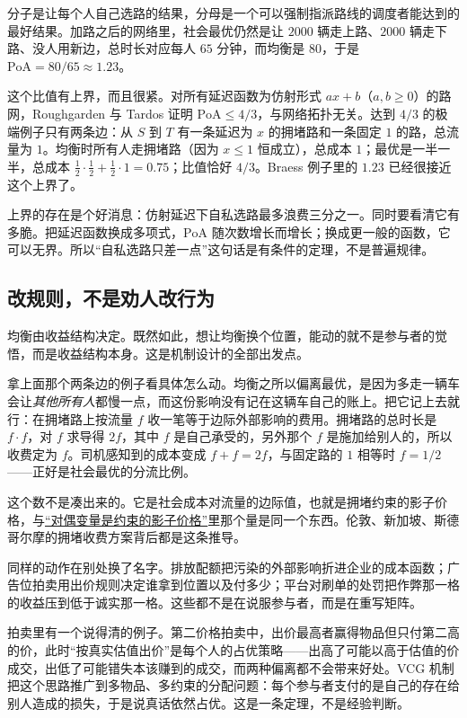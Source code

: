 分子是让每个人自己选路的结果，分母是一个可以强制指派路线的调度者能达到的最好结果。加路之后的网络里，社会最优仍然是让 \(2000\) 辆走上路、\(2000\) 辆走下路、没人用新边，总时长对应每人 \(65\) 分钟，而均衡是 \(80\)，于是 \(\mathrm{PoA}=80/65\approx1.23\)。

这个比值有上界，而且很紧。对所有延迟函数为仿射形式 \(a x+b\)（\(a,b\ge0\)）的路网，Roughgarden 与 Tardos 证明 \(\mathrm{PoA}\le4/3\)，与网络拓扑无关。达到 \(4/3\) 的极端例子只有两条边：从 \(S\) 到 \(T\) 有一条延迟为 \(x\) 的拥堵路和一条固定 \(1\) 的路，总流量为 \(1\)。均衡时所有人走拥堵路（因为 \(x\le1\) 恒成立），总成本 \(1\)；最优是一半一半，总成本 \(\tfrac12\cdot\tfrac12+\tfrac12\cdot1=0.75\)；比值恰好 \(4/3\)。Braess 例子里的 \(1.23\) 已经很接近这个上界了。

上界的存在是个好消息：仿射延迟下自私选路最多浪费三分之一。同时要看清它有多脆。把延迟函数换成多项式，\(\mathrm{PoA}\) 随次数增长而增长；换成更一般的函数，它可以无界。所以``自私选路只差一点''这句话是有条件的定理，不是普遍规律。

\subsection{改规则，不是劝人改行为}

均衡由收益结构决定。既然如此，想让均衡换个位置，能动的就不是参与者的觉悟，而是收益结构本身。这是机制设计的全部出发点。

拿上面那个两条边的例子看具体怎么动。均衡之所以偏离最优，是因为多走一辆车会让\emph{其他所有人}都慢一点，而这份影响没有记在这辆车自己的账上。把它记上去就行：在拥堵路上按流量 \(f\) 收一笔等于边际外部影响的费用。拥堵路的总时长是 \(f\cdot f\)，对 \(f\) 求导得 \(2f\)，其中 \(f\) 是自己承受的，另外那个 \(f\) 是施加给别人的，所以收费定为 \(f\)。司机感知到的成本变成 \(f+f=2f\)，与固定路的 \(1\) 相等时 \(f=1/2\)——正好是社会最优的分流比例。

这个数不是凑出来的。它是社会成本对流量的边际值，也就是拥堵约束的影子价格，与\hyperref[sec:09-Convex-Optimization/05-Duality/04]{``对偶变量是约束的影子价格''}里那个量是同一个东西。伦敦、新加坡、斯德哥尔摩的拥堵收费方案背后都是这条推导。

同样的动作在别处换了名字。排放配额把污染的外部影响折进企业的成本函数；广告位拍卖用出价规则决定谁拿到位置以及付多少；平台对刷单的处罚把作弊那一格的收益压到低于诚实那一格。这些都不是在说服参与者，而是在重写矩阵。

拍卖里有一个说得清的例子。第二价格拍卖中，出价最高者赢得物品但只付第二高的价，此时``按真实估值出价''是每个人的占优策略——出高了可能以高于估值的价成交，出低了可能错失本该赚到的成交，而两种偏离都不会带来好处。VCG 机制把这个思路推广到多物品、多约束的分配问题：每个参与者支付的是自己的存在给别人造成的损失，于是说真话依然占优。这是一条定理，不是经验判断。

